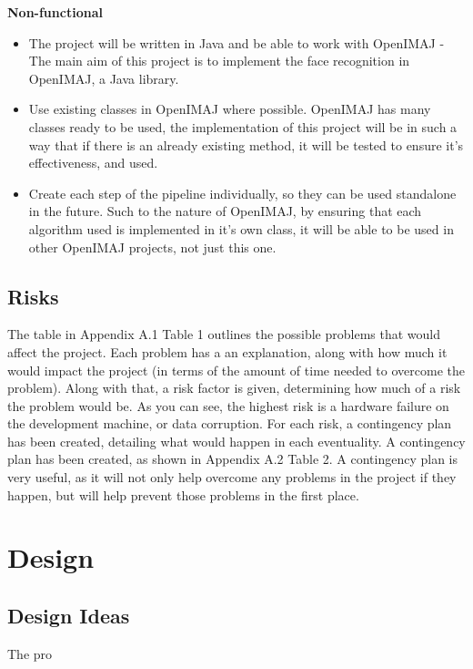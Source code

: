\documentclass[12pt, a4paper]{article}
\begin{document}
\textbf{Non-functional}
\begin{itemize}
\item The project will be written in Java and be able to work with OpenIMAJ - The main aim of this project is to implement the face recognition in OpenIMAJ, a Java library.
\item Use existing classes in OpenIMAJ where possible. OpenIMAJ has many classes ready to be used, the implementation of this project will be in such a way that if there is an already existing method, it will be tested to ensure it’s effectiveness, and used.
\item Create each step of the pipeline individually, so they can be used standalone in the future. Such to the nature of OpenIMAJ, by ensuring that each algorithm used is implemented in it’s own class, it will be able to be used in other OpenIMAJ projects, not just this one. 
\end{itemize}
\subsection{Risks}
The table in Appendix A.1 Table 1 outlines the possible problems that would affect the project. Each problem has a an explanation, along with how much it would impact the project (in terms of the amount of time needed to overcome the problem). Along with that, a risk factor is given, determining how much of a risk the problem would be. As you can see, the highest risk is a hardware failure on the development machine, or data corruption. For each risk, a contingency plan has been created, detailing what would happen in each eventuality. A contingency plan has been created, as shown in Appendix A.2 Table 2. A contingency plan is very useful, as it will not only help overcome any problems in the project if they happen, but will help prevent those problems in the first place. 

\section{Design}
\subsection{Design Ideas} %
The pro
\end{document}
